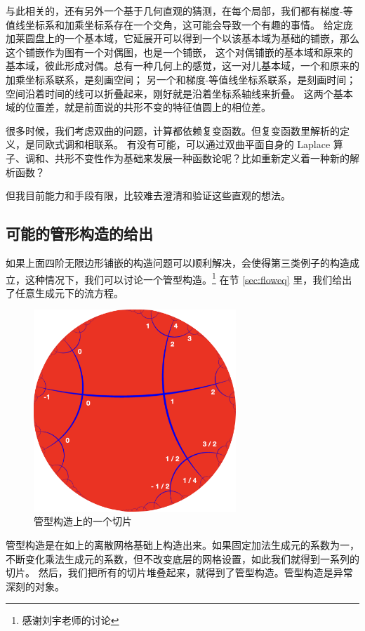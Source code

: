 \documentclass[a4paper,12pt]{article}
\numberwithin{problem}{section}
\numberwithin{definition}{section}
\numberwithin{lemma}{section}
\numberwithin{proposition}{section}
\numberwithin{theorem}{section}
\numberwithin{grammar}{section}
\numberwithin{program}{section}
\numberwithin{convention}{section}
\numberwithin{corollary}{section}
\begin{document}
与此相关的，还有另外一个基于几何直观的猜测，在每个局部，我们都有梯度-等值线坐标系和加乘坐标系存在一个交角，这可能会导致一个有趣的事情。
给定庞加莱圆盘上的一个基本域，它延展开可以得到一个以该基本域为基础的铺嵌，那么这个铺嵌作为图有一个对偶图，也是一个铺嵌，
这个对偶铺嵌的基本域和原来的基本域，彼此形成对偶。总有一种几何上的感觉，这一对儿基本域，一个和原来的加乘坐标系联系，是刻画空间；
另一个和梯度-等值线坐标系联系，是刻画时间；空间沿着时间的线可以折叠起来，刚好就是沿着坐标系轴线来折叠。
这两个基本域的位置差，就是前面说的共形不变的特征值圆上的相位差。

很多时候，我们考虑双曲的问题，计算都依赖复变函数。但复变函数里解析的定义，是同欧式调和相联系。
有没有可能，可以通过双曲平面自身的 Laplace 算子、调和、共形不变性作为基础来发展一种函数论呢？比如重新定义着一种新的解析函数？

但我目前能力和手段有限，比较难去澄清和验证这些直观的想法。

\subsection{可能的管形构造的给出}

如果上面四阶无限边形铺嵌的构造问题可以顺利解决，会使得第三类例子的构造成立，这种情况下，我们可以讨论一个管型构造。\footnote{感谢刘宇老师的讨论}
在节 \ref{sec:floweq} 里，我们给出了任意生成元下的流方程。

\begin{figure}[ht]
\centering
\includegraphics[width=3in]{images/assignment2.png}
\caption{管型构造上的一个切片}
\end{figure}

管型构造是在如上的离散网格基础上构造出来。如果固定加法生成元的系数为一，不断变化乘法生成元的系数，但不改变底层的网格设置，如此我们就得到一系列的切片。
然后，我们把所有的切片堆叠起来，就得到了管型构造。管型构造是异常深刻的对象。
\end{document}
